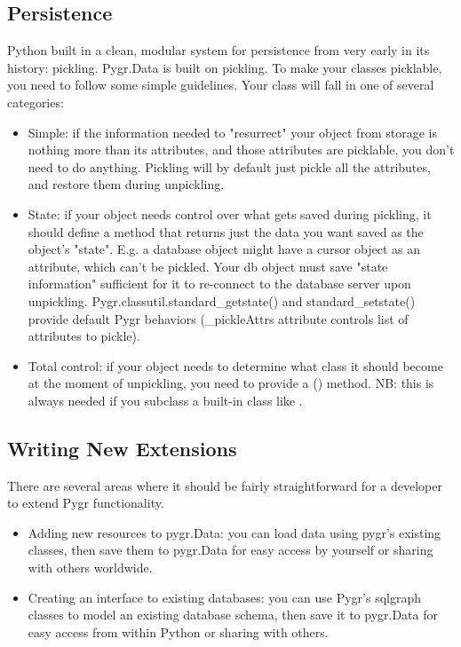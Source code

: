 \documentclass{howto}
\begin{document}
\begin{itemize}
\subsection{Persistence}
Python built in a clean, modular system for persistence from very early in its
history: pickling.  Pygr.Data is built on pickling.  To make your classes
picklable, you need to follow some simple guidelines.  Your class will fall
in one of several categories:
\begin{itemize}
\item Simple: if the information needed to "resurrect" your object from storage
is nothing more than its attributes, and those attributes are picklable, you
don't need to do anything.  Pickling will by default just pickle all the 
attributes, and restore them during unpickling.

\item State: if your object needs control over what gets saved during pickling,
it should define a  method that returns just the
data you want saved as the object's "state".  E.g. a database object might have a
cursor object as an attribute, which can't be pickled.  Your db object must
save "state information" sufficient for it to re-connect to the database server
upon unpickling.  Pygr.classutil.standard_getstate() and standard_setstate()
provide default Pygr behaviors (_pickleAttrs attribute controls list of attributes
to pickle).

\item Total control: if your object needs to determine what class it should
become at the moment of unpickling, you need to provide a ()
method.  NB: this is always needed if you subclass a built-in class like .
\end{itemize}

\subsection{Writing New Extensions}
There are several areas where it should be fairly straightforward
for a developer to extend Pygr functionality.
\begin{itemize}
\item Adding new resources to pygr.Data: you can load data using
pygr's existing classes, then save them to pygr.Data for easy
access by yourself or sharing with others worldwide.

\item Creating an interface to existing databases: you can
use Pygr's sqlgraph classes to model an existing database schema,
then save it to pygr.Data for easy access from within Python
or sharing with others.


\end{itemize}
\end{itemize}
\end{document}
